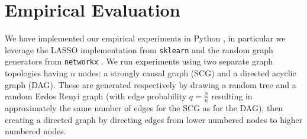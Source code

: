 \documentclass[12pt]{article}
\def\gcg{\mathcal{G}}  %
\def\B{\mathsf{B}}  %
\begin{document}


\section{Empirical Evaluation}
\label{sec:empirical_evaluation}
We have implemented our empirical experiments in Python \cite{scipy},
in particular we leverage the LASSO implementation from
\texttt{sklearn} \cite{sklearn} and the random graph generators from
\texttt{networkx} \cite{networkx}.  We run experiments using two
separate graph topologies having $n$ nodes: a strongly causal graph
(SCG) and a directed acyclic graph (DAG).  These are generated
respectively by drawing a random tree and a random Erdos Renyi graph
(with edge probability $q = \frac{2}{n}$ resulting in approximately
the same number of edges for the SCG as for the DAG), then creating a
directed graph by directing edges from lower numbered nodes to higher
numbered nodes.
\end{document}
